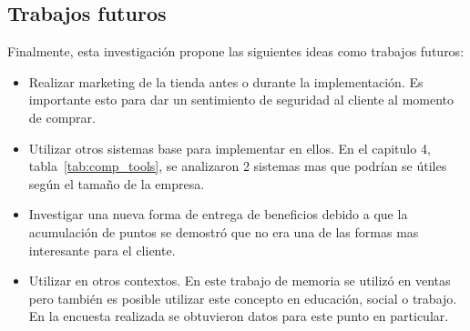 \subsection{Trabajos futuros}

Finalmente, esta investigación propone las siguientes ideas como trabajos futuros:


\begin{itemize}
    \item Realizar marketing de la tienda antes o durante la implementación.
          Es importante esto para dar un sentimiento de seguridad al cliente al
          momento de comprar.

    \item Utilizar otros sistemas base para implementar {\GAM} en ellos.
          En el capitulo 4, tabla~\ref{tab:comp_tools}, se analizaron 2 sistemas
          mas que podrían se útiles según el tamaño de la empresa.

    \item Investigar una nueva forma de entrega de beneficios debido a que la
          acumulación de puntos se demostró que no era una de las formas mas
          interesante para el cliente.

    \item Utilizar {\GAM} en otros contextos.
          En este trabajo de memoria se utilizó en ventas pero también es posible
          utilizar este concepto en educación, social o trabajo.
          En la encuesta realizada se obtuvieron datos para este punto en
          particular.
\end{itemize}

